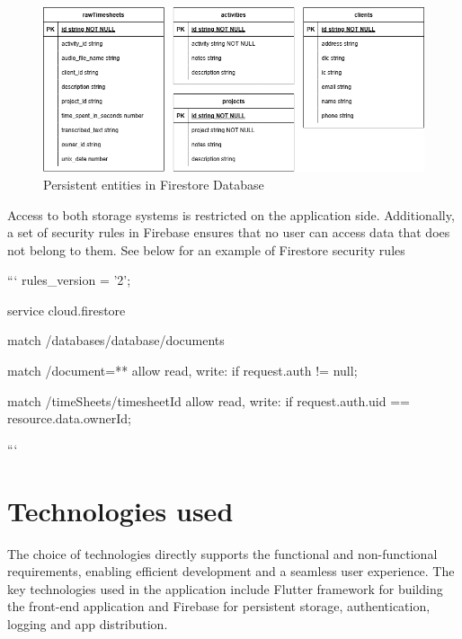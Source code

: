 \documentclass[
  digital,     %
  oneside,     %
  nosansbold,  %
  nocolorbold, %
  lof,         %
  lot,         %
]{fithesis4}
\begin{document}
\begin{figure}[ht]
    \centering
    \includegraphics[width=\textwidth]{assets/diagrams/entity-relationship-diagram.drawio.png}
    \caption{Persistent entities in Firestore Database}
    \label{fig:entity_diagram}
\end{figure}

Access to both storage systems is restricted on the application side. Additionally, a set of security rules in Firebase ensures that no user can access data that does not belong to them. See below for an example of Firestore security rules

\shorthandoff{-}
\begin{markdown}

```
rules_version = '2';

service cloud.firestore {
  match /databases/{database}/documents {
		match /{document=**} {
      allow read, write: if request.auth != null;
    }
    
    match /timeSheets/{timesheetId} {
      allow read, write: if request.auth.uid == resource.data.ownerId;
    }
  }
}
```

\end{markdown}

\shorthandon{-}

\chapter{Technologies used}

The choice of technologies directly supports the functional and non-functional requirements, enabling efficient development and a seamless user experience. The key technologies used in the application include Flutter framework for building the front-end application and Firebase for persistent storage, authentication, logging and app distribution.
\end{document}
